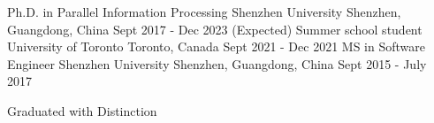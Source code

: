 \begin{cventries}
  \cventry
    {Ph.D. in Parallel Information Processing} %
    {Shenzhen University} %
    {Shenzhen, Guangdong, China} %
    {Sept 2017 - Dec 2023 (Expected)} %
    {}
  \cventry
    {Summer school student} %
    {University of Toronto} %
    {Toronto, Canada} %
    {Sept 2021 - Dec 2021} %
    {
    }
  \cventry
    {MS in Software Engineer} %
    {Shenzhen University} %
    {Shenzhen, Guangdong, China} %
    {Sept 2015 - July 2017} %
    {
      \begin{cvitems} %
        \item {Graduated with Distinction}
      \end{cvitems}
    }
\end{cventries}
